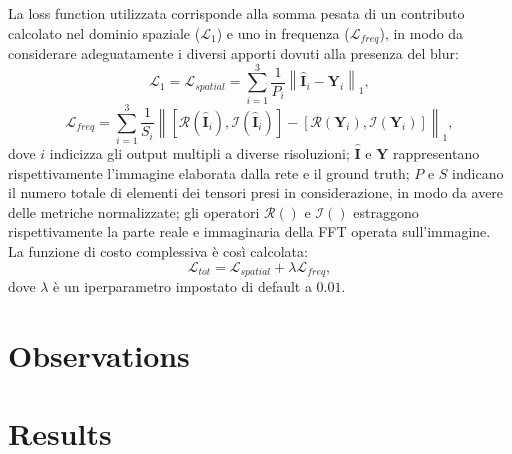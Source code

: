 \documentclass[a4paper,10pt,twocolumn]{article}
\begin{document}
La loss function utilizzata corrisponde alla somma pesata di un contributo calcolato nel dominio spaziale (\(\mathcal{L}_1\)) e uno in frequenza (\(\mathcal{L}_{freq}\)), in modo da considerare adeguatamente i diversi apporti dovuti alla presenza del blur:
\[
\mathcal{L}_1 = \mathcal{L}_{spatial} = \sum_{i=1}^{3}\frac{1}{P_i} \left\lVert \hat{\mathbf{I}}_i - \mathbf{Y}_i \right\rVert _1,
\]
\[
\mathcal{L}_{freq} = \sum_{i=1}^{3}\frac{1}{S_i} \left\lVert [\mathcal{R}(\hat{\mathbf{I}}_i), \mathcal{I}(\hat{\mathbf{I}}_i)] - [\mathcal{R}(\mathbf{Y}_i), \mathcal{I}(\mathbf{Y}_i)] \right\rVert _1,
\]
dove \(i\) indicizza gli output multipli a diverse risoluzioni; \(\hat{\mathbf{I}}\) e \(\mathbf{Y}\) rappresentano rispettivamente l'immagine elaborata dalla rete e il ground truth;
\(P\) e \(S\) indicano il numero totale di elementi dei tensori presi in considerazione, in modo da avere delle metriche normalizzate;
gli operatori \(\mathcal{R}()\) e \(\mathcal{I}()\) estraggono rispettivamente la parte reale e immaginaria della FFT operata sull'immagine.\\
La funzione di costo complessiva è così calcolata:
\[
\mathcal{L}_{tot} = \mathcal{L}_{spatial} + \lambda\mathcal{L}_{freq},
\]
dove \(\lambda\) è un iperparametro impostato di default a \(0.01\). 

\section{Observations}

\section{Results}

\printglossary[title=Glossary, toctitle=Glossary]

\printbibliography
\end{document}
